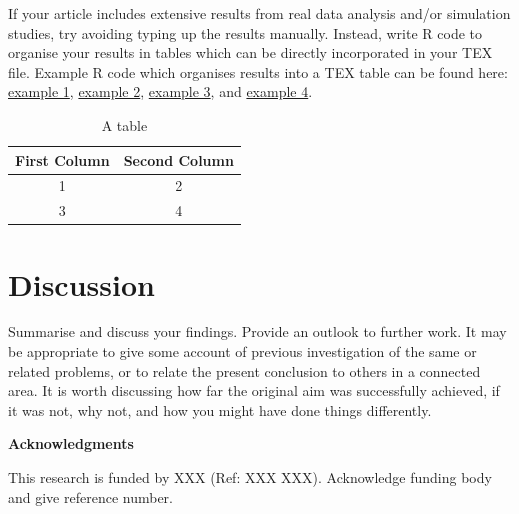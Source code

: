\documentclass[a4paper,amsmath, 12pt]{article}
\begin{document}
If your article includes extensive results from real data analysis and/or simulation studies, try avoiding typing up the results manually. Instead, write R code to organise your results in tables which can be directly incorporated in your TEX file. Example R code which organises results into a TEX table can be found here: \href{https://github.com/Yinghui-Wei-team/copula-regression-models-semi-competing-risks/blob/main/data_analysis/table/table_hr.R}{example 1},
\href{https://github.com/Yinghui-Wei-team/copula-regression-models-semi-competing-risks/blob/main/data_analysis/table/table_reg_coef.R}{example 2},
\href{https://github.com/Yinghui-Wei-team/copula-regression-models-semi-competing-risks/blob/main/simulation_1_cox_underlying_copula/table/sim1_table.R}{example 3}, and \href{https://github.com/Yinghui-Wei-team/copula-regression-models-semi-competing-risks/blob/main/simulation_2_misspecifications/table/sim2_table.R}{example 4}.


\begin{table}[h]
\caption{A table}
\begin{center}
\begin{tabular}{|c|c|}
\hline
First Column & Second Column \\
\hline
1 & 2 \\
\hline
3 & 4 \\
\hline
\end{tabular}
\end{center}
\end{table}




\section{Discussion}

Summarise and discuss your findings. Provide an outlook to further work. It may be appropriate to give some account of previous investigation of the same or related problems, or to relate the present conclusion to others in a connected area. It is worth discussing how far the original aim was successfully achieved, if it was not, why not, and how you might have done things differently.

\vspace{1cm}
\textbf{Acknowledgments}

This research is funded by XXX (Ref: XXX XXX). Acknowledge funding body and give reference number.
\end{document}
